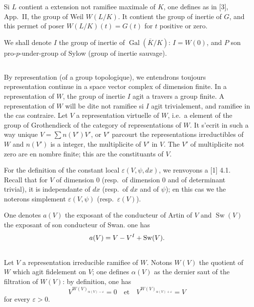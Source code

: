 \documentclass[12pt,a4paper]{article}
\theoremstyle{plain}
\theoremstyle{definition}
\theoremstyle{remark}
\DeclareMathOperator{\sw}{Sw}
\let\dim\relax\let\det\relax
\providecommand{\Gal}{\operatorname{Gal}}
\begin{document}
Si $L$ contient a extension not ramifiee maximale of $K$, one defines as in [3], App.~II, the group of Weil $W(L/K)$. It contient the group of inertie of $G$, and this permet of poser $W(L/K)(t) = G(t)$ for $t$ positive or zero.

We shall denote $I$ the group of inertie of $\Gal(\overline{K}/K)$: $I = W(0)$, and $P$ son pro-$p$-under-group of Sylow (group of inertie sauvage).

\subsection{}
\label{sec:0.5}

By representation (of a group topologique), we entendrons toujours representation continue in a space vector complex of dimension finite. In a representation of $W$, the group of inertie $I$ agit a travers a group finite. A representation of $W$ will be dite not ramifiee si $I$ agit trivialement, and ramifiee in the cas contraire. Let $V$ a representation virtuelle of $W$, i.e.~a element of the group of Grothendieck of the category of representations of $W$. It s'ecrit in such a way unique $V = \sum n(V') V'$, or $V'$ parcourt the representations irreductibles of $W$ and $n(V')$ is a integer, the multiplicite of $V'$ in $V$. The $V'$ of multiplicite not zero are en nombre finite; this are the constituants of $V$.

For the definition of the constant local $\varepsilon(V, \psi, dx)$, we renvoyons a [1] 4.1. Recall that for $V$ of dimension 0 (resp.~of dimension 0 and of determinant trivial), it is independante of $dx$ (resp.~of $dx$ and of $\psi$); en this cas we the noterons simplement $\varepsilon(V, \psi)$ (resp.~$\varepsilon(V)$).

One denotes $a(V)$ the exposant of the conducteur of Artin of $V$ and $\sw(V)$ the exposant of son conducteur of Swan. one has
\[
a(V) = \dim V - \dim V^I + \sw(V).
\]

\subsection{}
\label{sec:0.6}

Let $V$ a representation irreducible ramifiee of $W$. Notons $W(V)$ the quotient of $W$ which agit fidelement on $V$; one defines $\alpha(V)$ as the dernier saut of the filtration of $W(V)$: by definition, one has
\[
V^{W(V)_{\alpha(V)-\varepsilon}} = 0 \quad \text{et} \quad V^{W(V)_{\alpha(V)+\varepsilon}} = V
\]
for every $\varepsilon > 0$.
\end{document}
